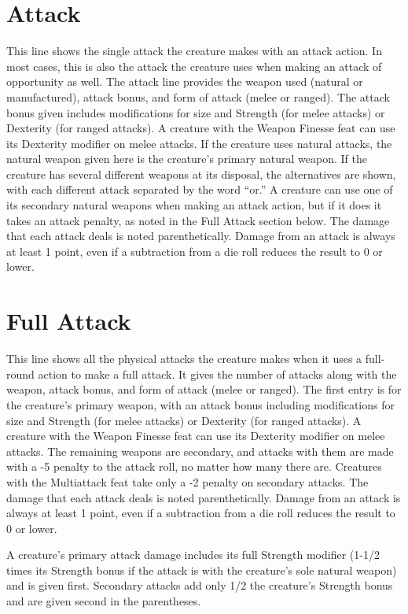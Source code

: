 \documentclass{article}
\begin{document}
\section*{\textbf{Attack}}

This line shows the single attack the creature makes with an attack action. In 
most cases, this is also the attack the creature uses when making an attack of 
opportunity as well. The attack line provides the weapon used (natural or manufactured), 
attack bonus, and form of attack (melee or ranged). The attack bonus given includes 
modifications for size and Strength (for melee attacks) or Dexterity (for ranged 
attacks). A creature with the Weapon Finesse feat can use its Dexterity modifier 
on melee attacks. If the creature uses natural attacks, the natural weapon given 
here is the creature's primary natural weapon. If the creature has several different 
weapons at its disposal, the alternatives are shown, with each different attack 
separated by the word ``or.'' A creature can use one of its secondary natural weapons 
when making an attack action, but if it does it takes an attack penalty, as noted 
in the Full Attack section below. The damage that each attack deals is noted parenthetically. 
Damage from an attack is always at least 1 point, even if a subtraction from a 
die roll reduces the result to 0 or lower.

\section*{\textbf{Full Attack}}

This line shows all the physical attacks the creature makes when it uses a full-round 
action to make a full attack. It gives the number of attacks along with the weapon, 
attack bonus, and form of attack (melee or ranged). The first entry is for the 
creature's primary weapon, with an attack bonus including modifications for size 
and Strength (for melee attacks) or Dexterity (for ranged attacks). A creature 
with the Weapon Finesse feat can use its Dexterity modifier on melee attacks. The 
remaining weapons are secondary, and attacks with them are made with a -5 penalty 
to the attack roll, no matter how many there are. Creatures with the Multiattack 
feat take only a -2 penalty on secondary attacks. The damage that each attack deals 
is noted parenthetically. Damage from an attack is always at least 1 point, even 
if a subtraction from a die roll reduces the result to 0 or lower.

A creature's primary attack damage includes its full Strength modifier (1-1/2 times 
its Strength bonus if the attack is with the creature's sole natural weapon) and 
is given first. Secondary attacks add only 1/2 the creature's Strength bonus and 
are given second in the parentheses. 
\end{document}
